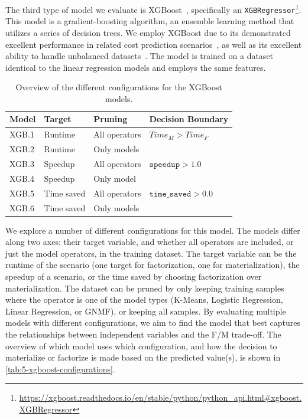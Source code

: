 The third type of model we evaluate is XGBoost~\cite{xgboost}, specifically an \texttt{XGBRegressor}\footnote{\url{https://xgboost.readthedocs.io/en/stable/python/python_api.html\#xgboost.XGBRegressor}}. This model is a gradient-boosting algorithm, an ensemble learning method that utilizes a series of decision trees. We employ XGBoost due to its demonstrated excellent performance in related cost prediction scenarios~\cite{tvm}, as well as its excellent ability to handle unbalanced datasets~\cite{xgboost_imbalanced_data}. The model is trained on a dataset identical to the linear regression models and employs the same features.

\begin{table}[ht]
  \centering
  \begin{tabular}{llll}
    \toprule
    Model & Target     & Pruning       & Decision Boundary            \\
    \midrule \midrule
    XGB.1 & Runtime    & All operators & $Time_M > Time_F$            \\
    XGB.2 & Runtime    & Only models   &                              \\
    XGB.3 & Speedup    & All operators & $\texttt{speedup} > 1.0$     \\
    XGB.4 & Speedup    & Only model    &                              \\
    XGB.5 & Time saved & All operators & $\texttt{time\_saved} > 0.0$ \\
    XGB.6 & Time saved & Only models   &                              \\
    \bottomrule
  \end{tabular}
  \caption[XGBoost configurations]{Overview of the different configurations for the XGBoost models.}
  \label{tab:5-xgboost-configurations}
\end{table}

We explore a number of different configurations for this model. The models differ along two axes: their target variable, and whether all operators are included, or just the model operators, in the training dataset. The target variable can be the runtime of the scenario (one target for factorization, one for materialization), the speedup of a scenario, or the time saved by choosing factorization over materialization. The dataset can be pruned by only keeping training samples where the operator is one of the model types (K-Means, Logistic Regression, Linear Regression, or GNMF), or keeping all samples. By evaluating multiple models with different configurations, we aim to find the model that best captures the relationships between independent variables and the F/M trade-off. The overview of which model uses which configuration, and how the decision to materialize or factorize is made based on the predicted value(s), is shown in \autoref{tab:5-xgboost-configurations}.

